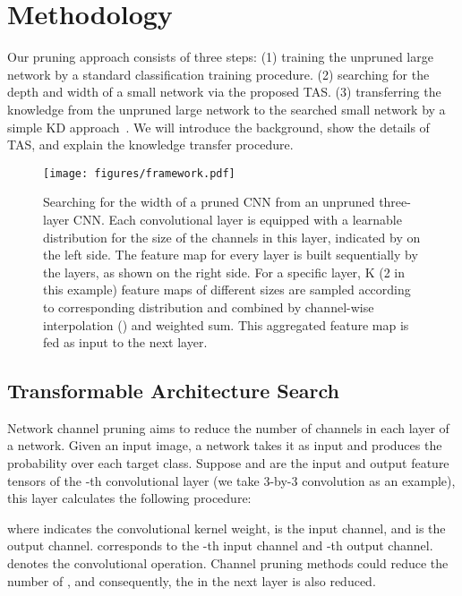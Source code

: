 \documentclass{article}
\def\NAME{{TAS}}
\begin{document}
\section{Methodology}\label{sec:method}

Our pruning approach consists of three steps:
(1) training the unpruned large network by a standard classification training procedure.
(2) searching for the depth and width of a small network via the proposed {\NAME}.
(3) transferring the knowledge from the unpruned large network to the searched small network by a simple KD approach~\cite{hinton2014distilling}.
We will introduce the background, show the details of {\NAME}, and explain the knowledge transfer procedure.


\begin{figure}
\centering
\texttt{[image: figures/framework.pdf]}
\caption{
Searching for the width of a pruned CNN from an unpruned three-layer CNN.
Each convolutional layer is equipped with a learnable distribution for the size of the channels in this layer, indicated by  on the left side.
The feature map for every layer is built sequentially by the layers, as shown on the right side.
For a specific layer, K (2 in this example) feature maps of different sizes are sampled according to corresponding distribution and combined by channel-wise interpolation () and weighted sum.
This aggregated feature map is fed as input to the next layer.
}
\label{fig:framework}
\end{figure}





\subsection{Transformable Architecture Search}\label{sec:method-TAS}
Network channel pruning aims to reduce the number of channels in each layer of a network.
Given an input image, a network takes it as input and produces the probability over each target class.
Suppose  and  are the input and output feature tensors of the -th convolutional layer (we take 3-by-3 convolution as an example), this layer calculates the following procedure:

\noindent where  indicates the convolutional kernel weight,  is the input channel, and  is the output channel.
 corresponds to the -th input channel and -th output channel.
 denotes the convolutional operation.
Channel pruning methods could reduce the number of , and consequently, the  in the next layer is also reduced.
\end{document}
